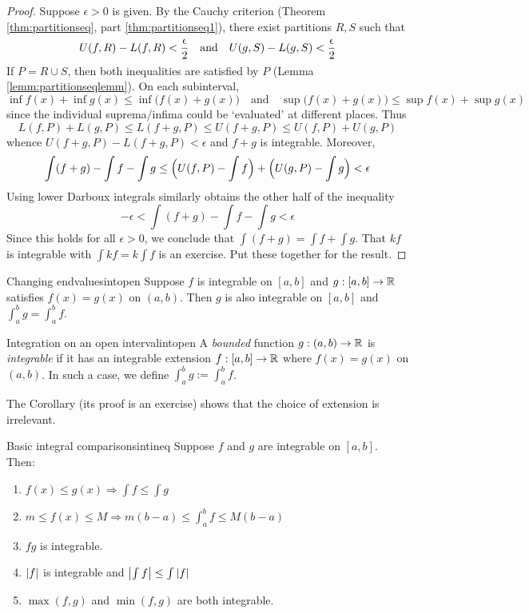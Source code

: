 \begin{proof}
	Suppose $\epsilon>0$ is given. By the Cauchy criterion (Theorem \ref{thm:partitionseq}, part \ref*{thm:partitionseq1}), there exist partitions $R,S$ such that
	\[
		U(f,R)-L(f,R)<\smash{\frac\epsilon 2}
		\quad\text{and}\quad 
		U(g,S)-L(g,S)<\smash{\frac\epsilon 2}
	\]
	If $P=R\cup S$, then both inequalities are satisfied by $P$ (Lemma \ref{lemm:partitionseqlemm}). On each subinterval,
	\[
		\inf f(x)+\inf g(x)\le \inf\bigl(f(x)+g(x)\bigr)
		\quad\text{and}\quad 
		\sup\bigl(f(x)+g(x)\bigr)\le\sup f(x)+\sup g(x)
	\]
	since the individual suprema/infima could be `evaluated' at different places. Thus
	\[
		L(f,P)+L(g,P)\le L(f+g,P)\le U(f+g,P)\le U(f,P)+U(g,P)
	\]
	whence $U(f+g,P)-L(f+g,P)<\epsilon$ and $f+g$ is integrable. Moreover,
	\[
		\int(f+g)-\int f-\int g \le \Bigl(U(f,P)-\int f\Bigr)+\Bigl(U(g,P)-\int g\Bigr)<\epsilon
	\]
	Using lower Darboux integrals similarly obtains the other half of the inequality
	\[
		-\epsilon<\int(f+g)-\int f-\int g<\epsilon
	\]
	Since this holds for all $\epsilon>0$, we conclude that $\int(f+g)=\int f+\int g$.\smallbreak
	That $kf$ is integrable with $\int kf=k\int f$ is an exercise. Put these together for the result.
\end{proof}


\begin{cor}{Changing endvalues}{intopen}
	Suppose $f$ is integrable on $[a,b]$ and $g:[a,b]\to\mathbb{R}$ satisfies $f(x)=g(x)$ on $(a,b)$. Then $g$ is also integrable on $[a,b]$ and $\int_a^b g=\int_a^b f$.
\end{cor}


\begin{defn}{Integration on an open interval}{intopen}
	A \emph{bounded} function $g:(a,b)\to\mathbb{R}$ is \emph{integrable} if it has an integrable extension $f:[a,b]\to\mathbb{R}$ where $f(x)=g(x)$ on $(a,b)$.
	In such a case, we define $\int_a^bg:=\int_a^bf$.
\end{defn}

The Corollary (its proof is an exercise) shows that the choice of extension is irrelevant.


\goodbreak


\begin{thm}{Basic integral comparisons}{intineq}
	Suppose $f$ and $g$ are integrable on $[a,b]$. Then:
	\begin{enumerate}\itemsep1pt\parsep=1pt
	  \item $f(x)\le g(x) \Longrightarrow\int f\le\int g$
	  \item $m\le f(x)\le M\Longrightarrow m(b-a)\le\int_a^bf\le M(b-a)$
	  \item $fg$ is integrable.
	  \item $\left| f\right|$ is integrable and $\left| \int f\right|\le\int \left| f\right|$
	  \item $\max(f,g)$ and $\min(f,g)$ are both integrable.
	\end{enumerate}
\end{thm}

